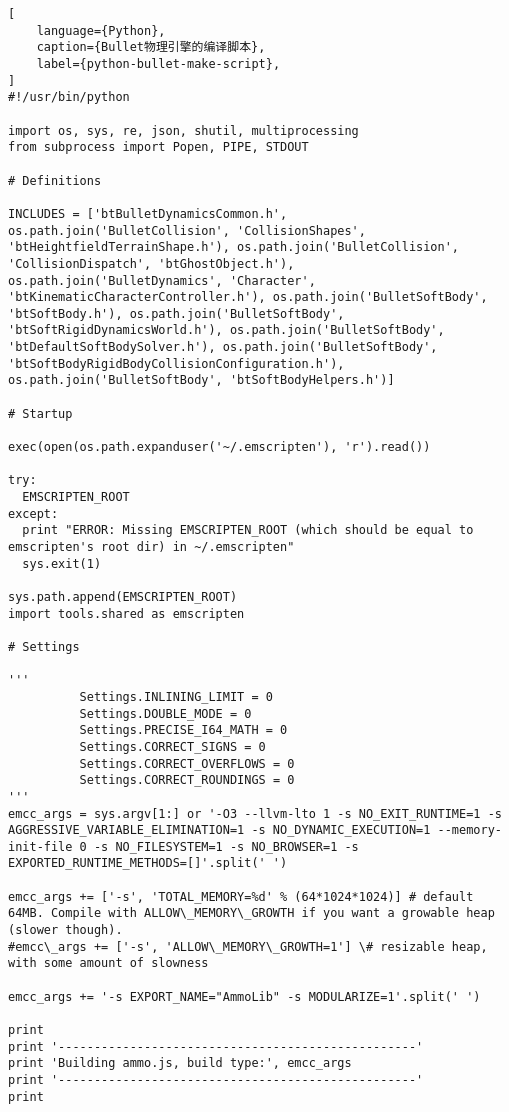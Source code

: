 \begin{lstlisting}[
    language={Python},
    caption={Bullet物理引擎的编译脚本},
    label={python-bullet-make-script},
]
#!/usr/bin/python

import os, sys, re, json, shutil, multiprocessing
from subprocess import Popen, PIPE, STDOUT

# Definitions

INCLUDES = ['btBulletDynamicsCommon.h', os.path.join('BulletCollision', 'CollisionShapes', 'btHeightfieldTerrainShape.h'), os.path.join('BulletCollision', 'CollisionDispatch', 'btGhostObject.h'), os.path.join('BulletDynamics', 'Character', 'btKinematicCharacterController.h'), os.path.join('BulletSoftBody', 'btSoftBody.h'), os.path.join('BulletSoftBody', 'btSoftRigidDynamicsWorld.h'), os.path.join('BulletSoftBody', 'btDefaultSoftBodySolver.h'), os.path.join('BulletSoftBody', 'btSoftBodyRigidBodyCollisionConfiguration.h'), os.path.join('BulletSoftBody', 'btSoftBodyHelpers.h')]

# Startup

exec(open(os.path.expanduser('~/.emscripten'), 'r').read())

try:
  EMSCRIPTEN_ROOT
except:
  print "ERROR: Missing EMSCRIPTEN_ROOT (which should be equal to emscripten's root dir) in ~/.emscripten"
  sys.exit(1)

sys.path.append(EMSCRIPTEN_ROOT)
import tools.shared as emscripten

# Settings

'''
          Settings.INLINING_LIMIT = 0
          Settings.DOUBLE_MODE = 0
          Settings.PRECISE_I64_MATH = 0
          Settings.CORRECT_SIGNS = 0
          Settings.CORRECT_OVERFLOWS = 0
          Settings.CORRECT_ROUNDINGS = 0
'''
emcc_args = sys.argv[1:] or '-O3 --llvm-lto 1 -s NO_EXIT_RUNTIME=1 -s AGGRESSIVE_VARIABLE_ELIMINATION=1 -s NO_DYNAMIC_EXECUTION=1 --memory-init-file 0 -s NO_FILESYSTEM=1 -s NO_BROWSER=1 -s EXPORTED_RUNTIME_METHODS=[]'.split(' ')

emcc_args += ['-s', 'TOTAL_MEMORY=%d' % (64*1024*1024)] # default 64MB. Compile with ALLOW\_MEMORY\_GROWTH if you want a growable heap (slower though).
#emcc\_args += ['-s', 'ALLOW\_MEMORY\_GROWTH=1'] \# resizable heap, with some amount of slowness

emcc_args += '-s EXPORT_NAME="AmmoLib" -s MODULARIZE=1'.split(' ')

print
print '--------------------------------------------------'
print 'Building ammo.js, build type:', emcc_args
print '--------------------------------------------------'
print


\end{lstlisting}
